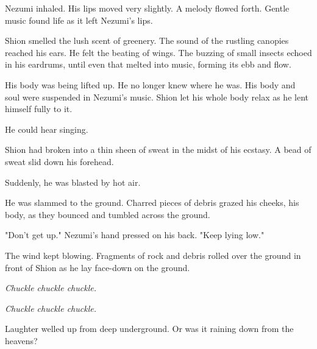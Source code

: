 Nezumi inhaled. His lips moved very slightly. A melody flowed forth.
Gentle music found life as it left Nezumi's lips.

Shion smelled the lush scent of greenery. The sound of the rustling
canopies reached his ears. He felt the beating of wings. The buzzing of
small insects echoed in his eardrums, until even that melted into music,
forming its ebb and flow.

His body was being lifted up. He no longer knew where he was. His body
and soul were suspended in Nezumi's music. Shion let his whole body
relax as he lent himself fully to it.

He could hear singing.



Shion had broken into a thin sheen of sweat in the midst of his ecstasy.
A bead of sweat slid down his forehead.

Suddenly, he was blasted by hot air.

He was slammed to the ground. Charred pieces of debris grazed his
cheeks, his body, as they bounced and tumbled across the ground.

"Don't get up." Nezumi's hand pressed on his back. "Keep lying low."

The wind kept blowing. Fragments of rock and debris rolled over the
ground in front of Shion as he lay face-down on the ground.

\emph{Chuckle chuckle chuckle.}

\emph{Chuckle chuckle chuckle.}

Laughter welled up from deep underground. Or was it raining down from
the heavens?

